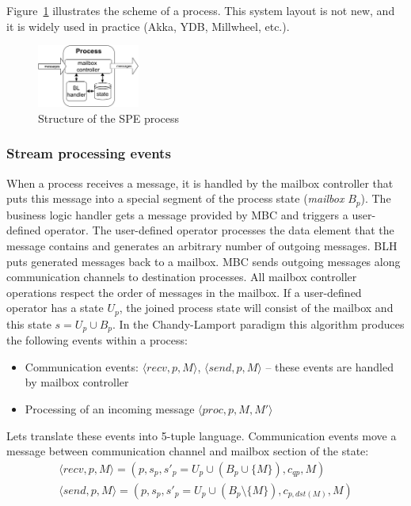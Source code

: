 Figure~\ref{fig:spe_process} illustrates the scheme of a process. This system layout is not new, and it is widely used in practice (Akka, YDB, Millwheel, etc.).

\begin{figure}[t]
  \centering
  \includegraphics[width=0.3\textwidth]{pics/process-scheme.pdf}
  \caption{Structure of the SPE process}
  \label{fig:spe_process}
\end{figure}

\subsubsection{Stream processing events}

When a process receives a message, it is handled by the mailbox controller that puts this message into a special segment of the process state ({\em mailbox} $B_p$). The business logic handler gets a message provided by MBC and triggers a user-defined operator. The user-defined operator processes the data element that the message contains and generates an arbitrary number of outgoing messages. BLH puts generated messages back to a mailbox. MBC sends outgoing messages along communication channels to destination processes. All mailbox controller operations respect the order of messages in the mailbox. If a user-defined operator has a state $U_p$, the joined process state will consist of the mailbox and this state $s=U_p \cup B_p$. In the Chandy-Lamport paradigm this algorithm produces the following events within a process:
\begin{itemize}
    \item Communication events: $\langle recv, p, M\rangle$, $\langle send, p, M \rangle$ -- these events are handled by mailbox controller
    \item Processing of an incoming message $\langle proc, p, M, M' \rangle$
\end{itemize}

Lets translate these events into 5-tuple language. Communication events move a message between communication channel and mailbox section of the state:
\begin{eqnarray}
\langle recv, p, M\rangle = (p, s_p, s'_p = U_p \cup \left(B_p \cup \{M\}\right), c_{qp}, M) \\
\langle send, p, M \rangle = (p, s_p, s'_p = U_p \cup \left(B_p\setminus\{M\}\right), c_{p, dst(M)}, M)
\end{eqnarray}

